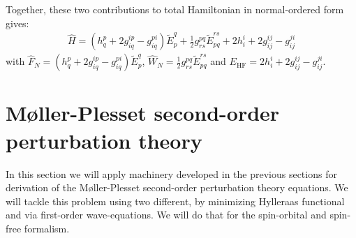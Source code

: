 \documentclass[journal=jacsat]{achemso}
\numberwithin{equation}{section}
\begin{document}
Together, these two contributions to total Hamiltonian in normal-ordered form gives:
\begin{align}
\hat{H}=(h^{p}_{q}+2g^{ip}_{iq}-g^{pi}_{iq})\tilde{E}^{q}_{p}+\frac{1}{2}g^{pq}_{rs}\tilde{E}^{rs}_{pq}+2h^{i}_{i}+2g^{ij}_{ij}-g^{ji}_{ij}
\end{align} 
with $\hat{F}_{N}=(h^{p}_{q}+2g^{ip}_{iq}-g^{pi}_{iq})\tilde{E}^{q}_{p}$, $\hat{W}_{N}=\frac{1}{2}g^{pq}_{rs}\tilde{E}^{rs}_{pq}$ and $E_{\text{HF}}=2h^{i}_{i}+2g^{ij}_{ij}-g^{ji}_{ij}$.

\section{M{\o}ller-Plesset second-order perturbation theory}
In this section we will apply machinery developed in the previous sections for derivation of the M{\o}ller-Plesset second-order perturbation theory equations. We will tackle this problem using two different, by minimizing Hylleraas functional and via first-order wave-equations. We will do that for the spin-orbital and spin-free formalism.
\end{document}

